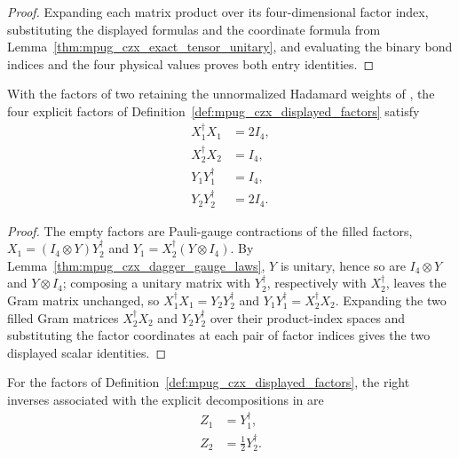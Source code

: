 \begin{proof}\leanok
    Expanding each matrix product over its four-dimensional factor index,
    substituting the displayed formulas and the coordinate formula from
    Lemma~\ref{thm:mpug_czx_exact_tensor_unitary}, and evaluating the
    binary bond indices and the four physical values proves both entry
    identities.
\end{proof}

\begin{lemma}
    \label{thm:mpug_czx_displayed_grams}
    \leanok
    With the factors of two retaining the unnormalized Hadamard weights of
    \cite[lines~4559--4659]{FrancoRubio2025MPUGauging}, the four explicit
    factors of Definition~\ref{def:mpug_czx_displayed_factors} satisfy
    \begin{align}
        X_1^\dagger X_1 & =2I_4,
        \label{eq:mpug_czx_displayed_gram_x1} \\
        X_2^\dagger X_2 & =I_4,
        \label{eq:mpug_czx_displayed_gram_x2} \\
        Y_1Y_1^\dagger  & =I_4,               \\
        Y_2Y_2^\dagger  & =2I_4.
    \end{align}
\end{lemma}

\begin{proof}\leanok
    The empty factors are Pauli-gauge contractions of the filled factors,
    $X_1=(I_4\otimes Y)Y_2^\dagger$ and $Y_1=X_2^\dagger(Y\otimes I_4)$.
    By Lemma~\ref{thm:mpug_czx_dagger_gauge_laws}, $Y$ is unitary, hence so
    are $I_4\otimes Y$ and $Y\otimes I_4$; composing a unitary matrix with
    $Y_2^\dagger$, respectively with $X_2^\dagger$, leaves the Gram matrix
    unchanged, so $X_1^\dagger X_1=Y_2Y_2^\dagger$ and
    $Y_1Y_1^\dagger=X_2^\dagger X_2$. Expanding the two filled
    Gram matrices $X_2^\dagger X_2$ and $Y_2Y_2^\dagger$ over their
    product-index spaces and substituting the factor coordinates at each
    pair of factor indices gives the two displayed scalar identities.
\end{proof}

\begin{definition}
    \label{def:mpug_czx_displayed_right_inverses}
    \leanok
    For the factors of Definition~\ref{def:mpug_czx_displayed_factors}, the
    right inverses associated with the explicit decompositions in
    \cite[lines~4559--4659]{FrancoRubio2025MPUGauging} are
    \begin{align}
        Z_1 & =Y_1^\dagger,         \\
        Z_2 & =\tfrac12Y_2^\dagger.
    \end{align}
\end{definition}

